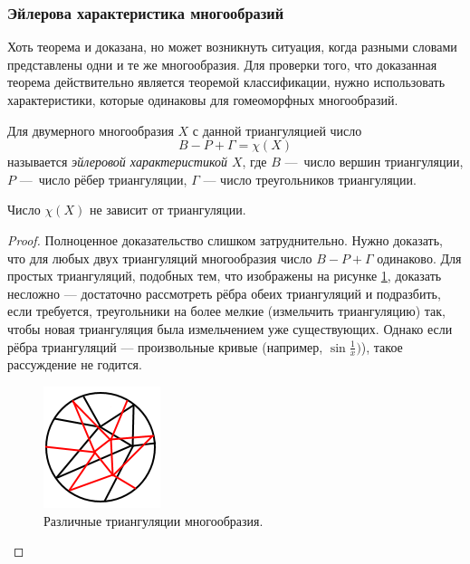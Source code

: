 \subsubsection{Эйлерова характеристика многообразий}

\begin{remark}
    Хоть теорема и доказана, но может возникнуть ситуация, когда разными словами представлены одни и те же многообразия. Для проверки того, что доказанная теорема действительно является теоремой классификации, нужно использовать характеристики, которые одинаковы для гомеоморфных многообразий.
\end{remark}

\begin{definition}
    Для двумерного многообразия $X$ с данной триангуляцией число
    \[B - P + \Gamma = \chi(X)\]
    называется \textit{эйлеровой характеристикой $X$}, где $B$ — число вершин триангуляции, $P$ — число рёбер триангуляции, $\Gamma$ — число треугольников триангуляции.
\end{definition} 

\begin{theorem}
    Число $\chi(X)$ не зависит от триангуляции.
\end{theorem} 
\begin{proof}
    Полноценное доказательство слишком затруднительно. Нужно доказать, что для любых двух триангуляций многообразия число $B - P + \Gamma$ одинаково. Для простых триангуляций, подобных тем, что изображены на рисунке \ref{fig:c11.1}, доказать несложно — достаточно рассмотреть рёбра обеих триангуляций и подразбить, если требуется, треугольники на более мелкие (измельчить триангуляцию) так, чтобы новая триангуляция была измельчением уже существующих. Однако если рёбра триангуляций — произвольные кривые (например, $\sin{\frac{1}x})$), такое рассуждение не годится.

    \begin{figure}[htbp]
        \centering
        \includegraphics[scale=0.7]{images/c11.1.png}
        \caption{Различные триангуляции многообразия.}
        \label{fig:c11.1}
    \end{figure}
\end{proof} 

